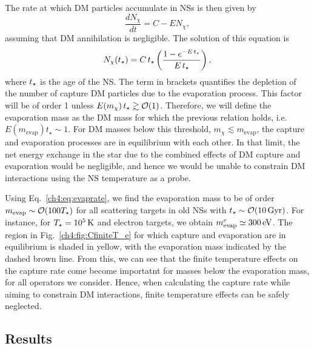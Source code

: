 The rate at which DM particles accumulate in NSs is then given by
\begin{equation}
\dfrac{dN_\chi}{dt} = C- E N_\chi,
\end{equation}
assuming that DM annihilation is negligible. The solution of this equation is 
\begin{equation}
N_\chi(t_\star) = C \, t_\star \left( \frac{ 1-e^{-E \, t_\star}}{E \, t_\star} \right),   
\end{equation}
where $t_\star$ is the age of the NS. The term in brackets quantifies the depletion of the number of capture DM particles due to the evaporation process. This factor will be of order 1 unless $E(m_\chi) \, t_\star \gtrsim {\cal O}(1)$. Therefore, we will define the evaporation mass as the DM mass for which the previous relation holds, i.e.  $E(m_\mathrm{evap}) t_\star \sim 1$. 
For DM masses below this threshold, $m_\chi \lesssim m_\mathrm{evap}$, the capture and evaporation processes are in equilibrium with each other. In that limit, the net energy exchange in the star due to the combined effects of DM capture and evaporation would be negligible, and hence we would be unable to constrain DM interactions using the NS temperature as a probe.


Using Eq.~\ref{ch4:eq:evaprate}, we find the evaporation mass to be of order $m_\mathrm{evap}\sim\mathcal{O}(100T_\star)$ for all scattering targets in old NSs with $t_\star\sim{\cal O}(10 {\rm \,Gyr})$. For instance, for $T_\star=10^5{\rm \,K}$ and electron targets, we obtain $m^e_\mathrm{evap}\simeq 300{\rm \,eV}$. 
The region in Fig.~\ref{ch4:fig:CfiniteT_e} for which capture and evaporation are in equilibrium is shaded in yellow, with the evaporation mass indicated by the dashed brown line. From this, we can see that the finite temperature effects on the capture rate come become importatnt for masses below the evaporation mass, for all operators we consider. Hence, when calculating the capture rate while aiming to constrain DM interactions, finite temperature effects can be safely neglected.



\subsection{Results}
\label{ch4:subsec:results_NS}

